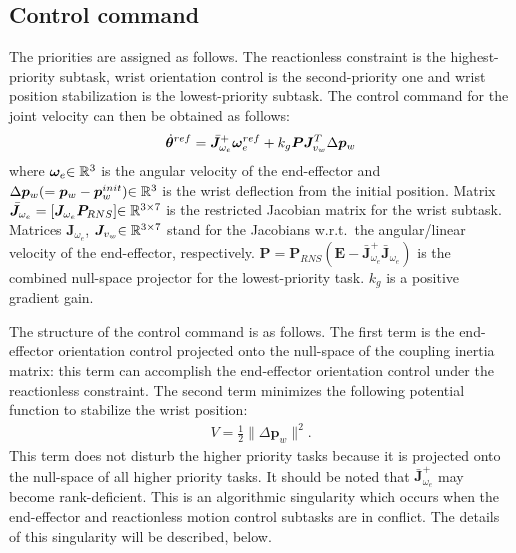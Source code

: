 \subsection{Control command}
\label{sec:CONTROLLER}
The priorities are assigned as follows.  The reactionless constraint is the highest-priority subtask,
wrist orientation control is the second-priority one and wrist position stabilization is the 
lowest-priority subtask. The control command for the joint velocity  
can then be obtained as follows:
%
\begin{align}
  {\dot{\bm{\theta}}}^{ref} = \bar{\bm{J}}_{\omega_{e}}^{+}\bm{\omega}_{e}^{ref} + k_{g}\bm{P}\bm{J}_{v_{w}}^{T}\Delta\bm{p}_{w}
  \label{eq:REF}
\end{align}
%
where $\bm{\omega}_{e}{\in\mathbb{R}^{3}}$ is the angular velocity of the end-effector and
$\Delta\bm{p}_{w} (= \bm{p}_{w} - \bm{p}_{w}^{init}){\in\mathbb{R}^{3}}$ is the wrist deflection from the initial position.
Matrix $\bar{\bm{J}}_{\omega_{e}} = [\bm{J}_{\omega_{e}}\bm{P}_{RNS}]{\in\mathbb{R}^{3 \times 7}}$ is the restricted Jacobian 
matrix \cite{Nenchev1992} for the wrist subtask. Matrices $\bm{J}_{\omega_{e}}$, $\bm{J}_{v_{w}}{\in\mathbb{R}^{3 \times 7}}$ 
stand for the Jacobians w.r.t.\ the angular/linear velocity of the 
end-effector, respectively. 
$\bm{P} = \bm{P}_{RNS}(\bm{E} - \bar{\bm{J}}_{\omega_{e}}^{+}\bar{\bm{J}}_{\omega_{e}})$ is the combined null-space 
projector for the lowest-priority task.
$k_{g}$ is a positive gradient gain.

The structure of the control command is as follows.
The first term is the end-effector orientation control projected onto the null-space of
the coupling inertia matrix:
this term can accomplish the end-effector orientation control under the reactionless constraint.
The second term minimizes the following potential function to stabilize the wrist position:
%
\begin{align}
 V = \frac{1}{2}\|\Delta\bm{p}_{w}\|^{2}.
\end{align}
%
This term does not disturb the higher priority tasks because it is projected
onto the null-space of all higher priority tasks.
It should be noted that $\bar{\bm{J}}_{\omega_{e}}^{+}$ may become rank-deficient. This is an 
algorithmic singularity which occurs when the end-effector and  reactionless motion control 
subtasks  are in conflict. The details of this singularity will be described, below.

